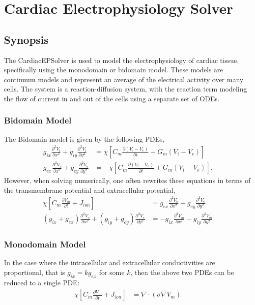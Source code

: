 \chapter{Cardiac Electrophysiology Solver}

\section{Synopsis}

The CardiacEPSolver is used to model the electrophysiology of cardiac
tissue, specifically using the monodomain or bidomain model. These models are
continuum models and represent an average of the electrical activity over many
cells. The system is a reaction-diffusion system, with the reaction term
modeling the flow of current in and out of the cells using a separate set of
ODEs.

\subsection{Bidomain Model}
The Bidomain model is given by the following PDEs,
\begin{align*}
g_{ix}\frac{\partial^2 V_i}{\partial x^2} + g_{iy}\frac{\partial^2 V_i}{\partial y^2} &=  \chi \left[ C_m \frac{\partial(V_i-V_e)}{\partial t} + G_m(V_i-V_e) \right] \\
g_{ex}\frac{\partial^2 V_e}{\partial x^2} + g_{ey}\frac{\partial^2 V_e}{\partial y^2} &= -\chi\left[ C_m \frac{\partial(V_i-V_e)}{\partial t} + G_m(V_i-V_e) \right].
\end{align*}
However, when solving numerically, one often rewrites these equations in terms
of the transmembrane potential and extracellular potential,
\begin{align*}
\chi \left[ C_m \frac{\partial V_m}{\partial t} + J_{ion} \right] &= g_{ex}\frac{\partial^2 V_e}{\partial x^2} + g_{ey}\frac{\partial^2 V_e}{\partial y^2}\\
(g_{ix} + g_{ex})\frac{\partial^2 V_e}{\partial x^2} + (g_{iy} + g_{ey})\frac{\partial^2 V_e}{\partial y^2} 
  &= -g_{ix} \frac{\partial^2 V_m}{\partial x^2} - g_{iy} \frac{\partial^2 V_m}{\partial y^2}
\end{align*}

\subsection{Monodomain Model}
In the case where the intracellular and extracellular conductivities are
proportional, that is $g_{ix} = kg_{ex}$ for some $k$,
then the above two PDEs can be reduced to a single PDE:
\begin{align*}
\chi\left[ C_m \frac{\partial V_m}{\partial t} + J_{ion} \right] &= \nabla \cdot (\sigma \nabla V_m)
\end{align*}

